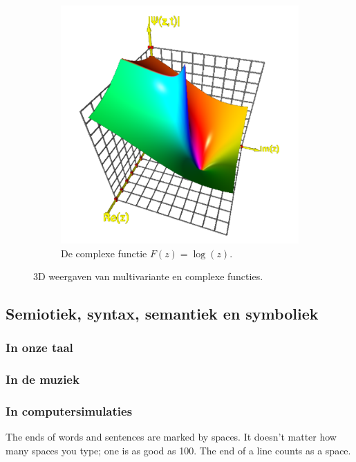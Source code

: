 \documentclass{article}      %
\begin{document}
\begin{figure}[h!]
\begin{subfigure}[b]{0.49\linewidth}
    \includegraphics[width=\linewidth]{images/complex_function_plot.png}
    \caption{De complexe functie $F(z) = \log(z)$.}
  \end{subfigure}
  \caption{3D weergaven van multivariante en complexe functies.}
  \label{fig:coffee}
\end{figure}

\subsection{Semiotiek, syntax, semantiek en symboliek}

\subsubsection{In onze taal}

\subsubsection{In de muziek}

\subsubsection{In computersimulaties}

The ends  of words and sentences are marked
  by   spaces. It  doesn't matter how many
spaces    you type; one is as good as 100.  The
end of   a line counts as a space.
\end{document}
